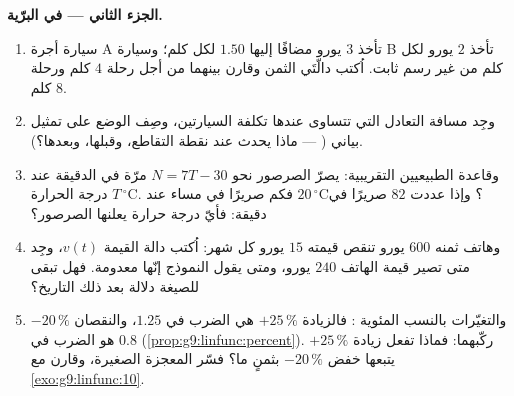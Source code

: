 \begin{problem}
\medskip
\noindent\textbf{الجزء الثاني ---  في البرّية.}
\begin{enumerate}[resume]
  \item سيارة أجرة A تأخذ $3$ يورو مضافًا إليها $1.50$ لكل كلم؛
        وسيارة B تأخذ $2$ يورو لكل كلم من غير رسم ثابت. اُكتب
        دالّتَي الثمن وقارن بينهما من أجل رحلة $4$ كلم ورحلة
        $8$ كلم.
  \item وجِد مسافة التعادل التي تتساوى عندها تكلفة
        السيارتين، وصِف الوضع على تمثيل بياني ( ---
        ماذا يحدث عند نقطة التقاطع، وقبلها، وبعدها؟).
  \item وقاعدة الطبيعيين التقريبية: يصرّ الصرصور نحو
        $N = 7T - 30$ مرّة في الدقيقة عند درجة الحرارة
        $T\,^\circ$C. فكم صريرًا في مساء عند $20\,^\circ$C؟
        وإذا عددت $82$ صريرًا في دقيقة: فأيّ درجة حرارة يعلنها
        الصرصور؟
  \item وهاتف ثمنه $600$ يورو تنقص قيمته $15$ يورو كل شهر:
        اُكتب دالة القيمة $v(t)$، وجِد متى تصير قيمة الهاتف
        $240$ يورو، ومتى يقول النموذج إنّها معدومة. فهل تبقى
        للصيغة دلالة بعد ذلك التاريخ؟
  \item والتغيّرات بالنسب المئوية : فالزيادة
        $+25\,\%$ هي الضرب في $1.25$، والنقصان $-20\,\%$ هو
        الضرب في $0.8$ (\cref{prop:g9:linfunc:percent}).
        ركّبهما: فماذا تفعل زيادة $+25\,\%$ يتبعها خفض
        $-20\,\%$ بثمنٍ ما؟ فسّر المعجزة الصغيرة، وقارن مع
        \cref{exo:g9:linfunc:10}.
\end{enumerate}


\end{problem}
